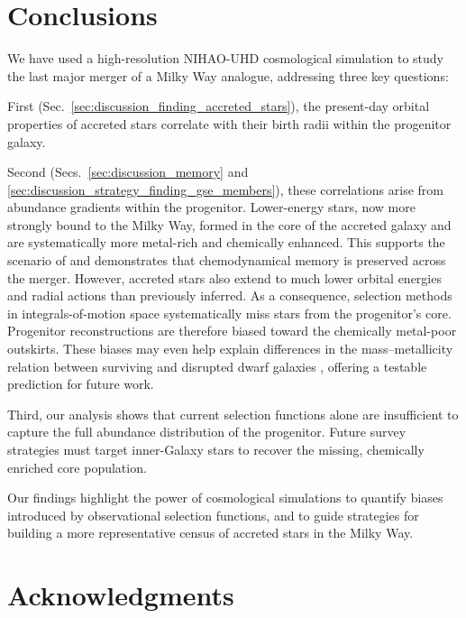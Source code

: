 \documentclass[fleqn,usenatbib]{mnras}
\begin{document}
\section{Conclusions}
\label{sec:conclusions}

We have used a high-resolution NIHAO-UHD cosmological simulation to study the last major merger of a Milky Way analogue, addressing three key questions:

First (Sec.~\ref{sec:discussion_finding_accreted_stars}), the present-day orbital properties of accreted stars correlate with their birth radii within the progenitor galaxy.

Second (Secs.~\ref{sec:discussion_memory} and \ref{sec:discussion_strategy_finding_gse_members}), these correlations arise from abundance gradients within the progenitor. Lower-energy stars, now more strongly bound to the Milky Way, formed in the core of the accreted galaxy and are systematically more metal-rich and chemically enhanced. This supports the scenario of \citet{Skuladottir2025} and demonstrates that chemodynamical memory is preserved across the merger. However, accreted stars also extend to much lower orbital energies and radial actions than previously inferred. As a consequence, selection methods in integrals-of-motion space \citep{Helmi2018, Feuillet2021, Monty2024} systematically miss stars from the progenitor’s core. Progenitor reconstructions are therefore biased toward the chemically metal-poor outskirts. These biases may even help explain differences in the mass–metallicity relation between surviving and disrupted dwarf galaxies \citep{Naidu2022}, offering a testable prediction for future work.

Third, our analysis shows that current selection functions alone are insufficient to capture the full abundance distribution of the progenitor. Future survey strategies must target inner-Galaxy stars to recover the missing, chemically enriched core population.

Our findings highlight the power of cosmological simulations to quantify biases introduced by observational selection functions, and to guide strategies for building a more representative census of accreted stars in the Milky Way.

\section*{Acknowledgments}
\end{document}
